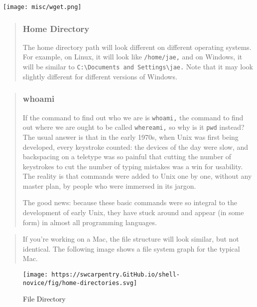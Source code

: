 \documentclass[
]{book}
\begin{document}
\texttt{[image: misc/wget.png]}

\begin{quote}
\hypertarget{home-directory}{%
\subsubsection{Home Directory}\label{home-directory}}

The home directory path will look different on different operating systems. For example, on Linux, it will look like \texttt{/home/jae,} and on Windows, it will be similar to \texttt{C:\textbackslash{}Documents\ and\ Settings\textbackslash{}jae.} Note that it may look slightly different for different versions of Windows.
\end{quote}

\begin{quote}
\hypertarget{whoami}{%
\subsubsection{whoami}\label{whoami}}

If the command to find out who we are is \texttt{whoami,} the command to find out where we are ought to be called \texttt{whereami,} so why is it \texttt{pwd} instead? The usual answer is that in the early 1970s, when Unix was first being developed, every keystroke counted: the devices of the day were slow, and backspacing on a teletype was so painful that cutting the number of keystrokes to cut the number of typing mistakes was a win for usability. The reality is that commands were added to Unix one by one, without any master plan, by people who were immersed in its jargon.

The good news: because these basic commands were so integral to the development of early Unix, they have stuck around and appear (in some form) in almost all programming languages.
\end{quote}

\begin{quote}
If you're working on a Mac, the file structure will look similar, but not identical. The following image shows a file system graph for the typical Mac.
\end{quote}

\begin{figure}
\centering
\texttt{[image: https://swcarpentry.GitHub.io/shell-novice/fig/home-directories.svg]}
\caption{File Directory}
\end{figure}
\end{document}
